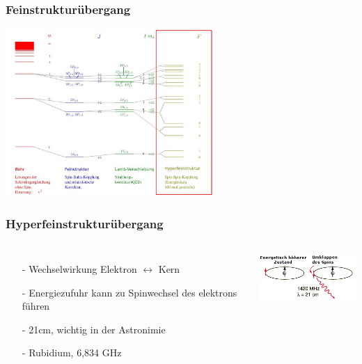 \begin{frame}
	\frametitle {Feinstrukturübergang}
	
	\begin{center}
		\includegraphics[width = 8cm]{./pictures/energieniveaus3}
	\end{center}
	
\end{frame}

\begin{frame}
	\frametitle{Hyperfeinstrukturübergang}
	\begin{columns}
		\begin{itemize}
			\item[-] Wechselwirkung Elektron $\leftrightarrow$ Kern
			\item[-] Energiezufuhr kann zu Spinwechsel des elektrons führen
			\item[ ]
			\item[-] 21cm, wichtig in der Astronimie
			\item[]
			\item[-] Rubidium, 6,834 GHz
		\end{itemize}
		\includegraphics[width = 4cm]{./pictures/h21b}
	\end{columns}
	
\end{frame}



